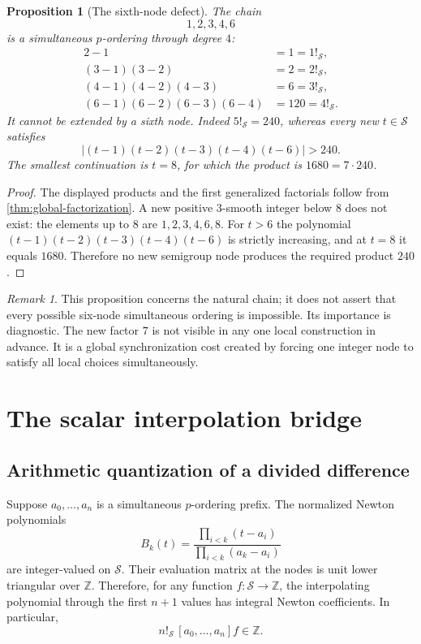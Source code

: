 \documentclass[11pt]{article}
\newtheorem{proposition}[theorem]{Proposition}
\theoremstyle{definition}
\theoremstyle{remark}
\newtheorem{remark}[theorem]{Remark}
\newcommand{\Z}{\mathbb Z}
\newcommand{\calS}{\mathcal S}
\newcommand{\abs}[1]{\left|#1\right|}
\begin{document}
\begin{proposition}[The sixth-node defect]\label{prop:sixth-node}
The chain
\[
       1,2,3,4,6
\]
is a simultaneous $p$-ordering through degree $4$:
\[
\begin{aligned}
  2-1&=1=1!_{\calS},\\
  (3-1)(3-2)&=2=2!_{\calS},\\
  (4-1)(4-2)(4-3)&=6=3!_{\calS},\\
  (6-1)(6-2)(6-3)(6-4)&=120=4!_{\calS}.
\end{aligned}
\]
It cannot be extended by a sixth node.  Indeed $5!_{\calS}=240$, whereas every new $t\in\calS$ satisfies
\[
  \abs{(t-1)(t-2)(t-3)(t-4)(t-6)}>240.
\]
The smallest continuation is $t=8$, for which the product is $1680=7\cdot240$.
\end{proposition}
\begin{proof}
The displayed products and the first generalized factorials follow from \cref{thm:global-factorization}.  A new positive $3$-smooth integer below $8$ does not exist: the elements up to $8$ are $1,2,3,4,6,8$.  For $t>6$ the polynomial
$(t-1)(t-2)(t-3)(t-4)(t-6)$ is strictly increasing, and at $t=8$ it equals $1680$.  Therefore no new semigroup node produces the required product $240$.
\end{proof}

\begin{remark}
This proposition concerns the natural chain; it does not assert that every possible six-node simultaneous ordering is impossible.  Its importance is diagnostic.  The new factor $7$ is not visible in any one local construction in advance.  It is a global synchronization cost created by forcing one integer node to satisfy all local choices simultaneously.
\end{remark}

\section{The scalar interpolation bridge}

\subsection{Arithmetic quantization of a divided difference}
Suppose $a_0,\dots,a_n$ is a simultaneous $p$-ordering prefix.  The normalized Newton polynomials
\[
 B_k(t)=\frac{\prod_{i<k}(t-a_i)}{\prod_{i<k}(a_k-a_i)}
\]
are integer-valued on $\calS$.  Their evaluation matrix at the nodes is unit lower triangular over $\Z$.  Therefore, for any function $f:\calS\to\Z$, the interpolating polynomial through the first $n+1$ values has integral Newton coefficients.  In particular,
\begin{equation}\label{eq:quantization}
       n!_{\calS}\,[a_0,\dots,a_n]f\in\Z.
\end{equation}
\end{document}
